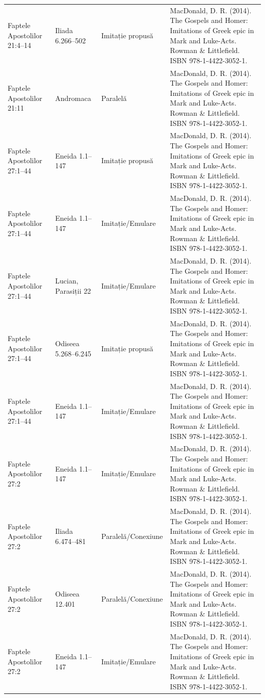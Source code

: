 \documentclass[12pt,a4paper,twoside,openany]{book}
\begin{document}
\begin{longtable}{L{1.4cm}L{1.7cm}L{3.1cm}L{8.4cm}}
Faptele Apostolilor 21:4–14 & Iliada 6.266–502 & Imitație propusă & MacDonald, D. R. (2014). The Gospels and Homer: Imitations of Greek epic in Mark and Luke-Acts. Rowman \& Littlefield. ISBN 978-1-4422-3052-1. \\
Faptele Apostolilor 21:11 & Andromaca & Paralelă & MacDonald, D. R. (2014). The Gospels and Homer: Imitations of Greek epic in Mark and Luke-Acts. Rowman \& Littlefield. ISBN 978-1-4422-3052-1. \\
Faptele Apostolilor 27:1–44 & Eneida 1.1–147 & Imitație propusă & MacDonald, D. R. (2014). The Gospels and Homer: Imitations of Greek epic in Mark and Luke-Acts. Rowman \& Littlefield. ISBN 978-1-4422-3052-1. \\
Faptele Apostolilor 27:1–44 & Eneida 1.1–147 & Imitație/Emulare & MacDonald, D. R. (2014). The Gospels and Homer: Imitations of Greek epic in Mark and Luke-Acts. Rowman \& Littlefield. ISBN 978-1-4422-3052-1. \\
Faptele Apostolilor 27:1–44 & Lucian, Parasiții 22 & Imitație/Emulare & MacDonald, D. R. (2014). The Gospels and Homer: Imitations of Greek epic in Mark and Luke-Acts. Rowman \& Littlefield. ISBN 978-1-4422-3052-1. \\
Faptele Apostolilor 27:1–44 & Odiseea 5.268–6.245 & Imitație propusă & MacDonald, D. R. (2014). The Gospels and Homer: Imitations of Greek epic in Mark and Luke-Acts. Rowman \& Littlefield. ISBN 978-1-4422-3052-1. \\
Faptele Apostolilor 27:1–44 & Eneida 1.1–147 & Imitație/Emulare & MacDonald, D. R. (2014). The Gospels and Homer: Imitations of Greek epic in Mark and Luke-Acts. Rowman \& Littlefield. ISBN 978-1-4422-3052-1. \\
Faptele Apostolilor 27:2 & Eneida 1.1–147 & Imitație/Emulare & MacDonald, D. R. (2014). The Gospels and Homer: Imitations of Greek epic in Mark and Luke-Acts. Rowman \& Littlefield. ISBN 978-1-4422-3052-1. \\
Faptele Apostolilor 27:2 & Iliada 6.474–481 & Paralelă/Conexiune & MacDonald, D. R. (2014). The Gospels and Homer: Imitations of Greek epic in Mark and Luke-Acts. Rowman \& Littlefield. ISBN 978-1-4422-3052-1. \\
Faptele Apostolilor 27:2 & Odiseea 12.401 & Paralelă/Conexiune & MacDonald, D. R. (2014). The Gospels and Homer: Imitations of Greek epic in Mark and Luke-Acts. Rowman \& Littlefield. ISBN 978-1-4422-3052-1. \\
Faptele Apostolilor 27:2 & Eneida 1.1–147 & Imitație/Emulare & MacDonald, D. R. (2014). The Gospels and Homer: Imitations of Greek epic in Mark and Luke-Acts. Rowman \& Littlefield. ISBN 978-1-4422-3052-1. \\

\end{longtable}
\end{document}
